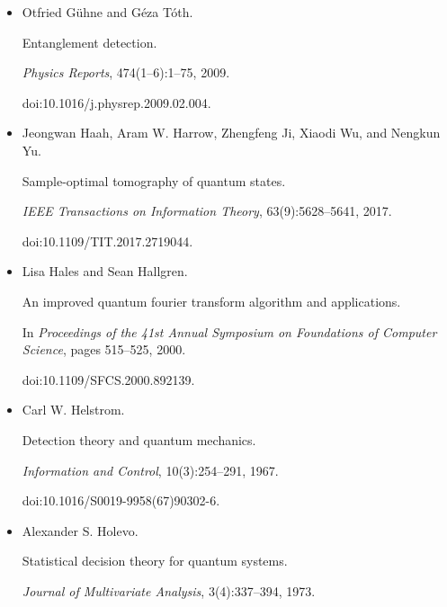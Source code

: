 \begin{itemize}
doi:10.1103/PhysRevA.76.030305.





\item[] 
[20]

Otfried Gühne and Géza Tóth.


Entanglement detection.


\emph{Physics Reports}, 474(1–6):1–75, 2009.


doi:10.1016/j.physrep.2009.02.004.





\item[] 
[21]

Jeongwan Haah, Aram W. Harrow, Zhengfeng Ji, Xiaodi Wu, and Nengkun Yu.


Sample-optimal tomography of quantum states.


\emph{IEEE Transactions on Information Theory}, 63(9):5628–5641,
2017.


doi:10.1109/TIT.2017.2719044.





\item[] 
[22]

Lisa Hales and Sean Hallgren.


An improved quantum fourier transform algorithm and applications.


In \emph{Proceedings of the 41st Annual Symposium on Foundations of
Computer Science}, pages 515–525, 2000.


doi:10.1109/SFCS.2000.892139.





\item[] 
[23]

Carl W. Helstrom.


Detection theory and quantum mechanics.


\emph{Information and Control}, 10(3):254–291, 1967.


doi:10.1016/S0019-9958(67)90302-6.





\item[] 
[24]

Alexander S. Holevo.


Statistical decision theory for quantum systems.


\emph{Journal of Multivariate Analysis}, 3(4):337–394, 1973.



\end{itemize}
